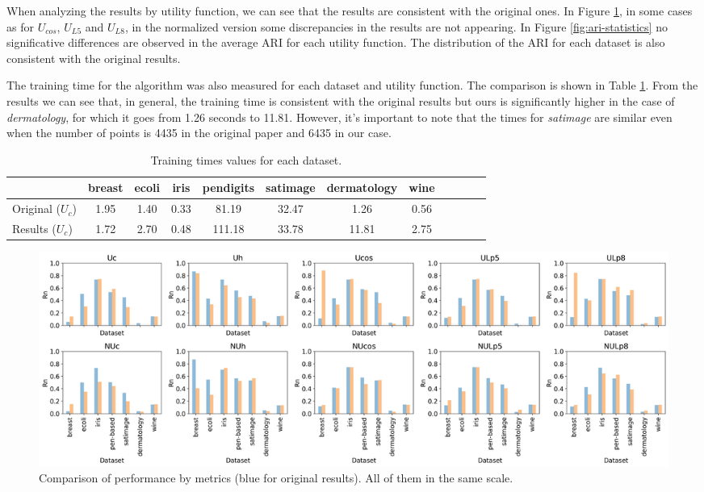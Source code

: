 \documentclass[twocolumn]{article}
\begin{document}
When analyzing the results by utility function, we can see that the results are consistent with the original ones. In Figure \ref{fig:ari-metrics},
in some cases as for $U_{cos}$, $U_{L5}$ and $U_{L8}$, in the normalized version some discrepancies in the results are not appearing. In Figure \ref{fig:ari-statistics}
no significative differences are observed in the average ARI for each utility function. The distribution of the ARI for each dataset is also consistent with the original
results.

The training time for the algorithm was also measured for each dataset and utility function. The comparison is shown in Table \ref{tab:time_values_per_dataset}. From the
results we can see that, in general, the training time is consistent with the original results but ours is significantly higher
in the case of \textit{dermatology}, for which it goes from 1.26 seconds to 11.81. However, it's important to note that the times for \textit{satimage} are similar
even when the number of points is 4435 in the original paper and 6435 in our case.

\begin{table}[t!]
  \centering
  \begin{tabular}{l|ccccccccccc}
  \toprule
   & breast & ecoli & iris & pendigits & satimage & dermatology & wine \\
  \midrule
  Original ($U_c$) & 1.95 & 1.40 & 0.33 & 81.19 & 32.47 & 1.26 & 0.56 \\
  Results ($U_c$) & 1.72 & 2.70 & 0.48 & 111.18 & 33.78 & 11.81 & 2.75 \\
  \bottomrule
  \end{tabular}
  \caption{Training times values for each dataset.}
  \label{tab:time_values_per_dataset}
  \end{table}

\begin{figure}[h]
  \centering
  \includegraphics[width=\textwidth]{img/results_comparison_metric.jpg}
  \caption{Comparison of performance by metrics (blue for original results). All of them in the same scale.}
  \label{fig:ari-metrics}
\end{figure}
\end{document}
